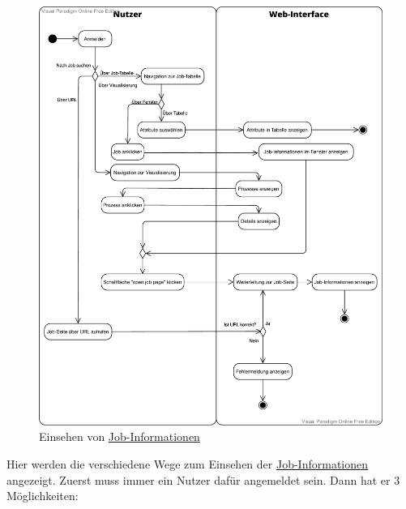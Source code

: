 \begin{figure}[H]
    \centering
    \includegraphics[width=\textwidth]{images-interface/v3_aktivitaetsdiagramme/Get_information_v3.pdf}
    \caption{Einsehen von \hyperref[B:Job-Informationen]{Job-Informationen}}
\end{figure}
\newpage
Hier werden die verschiedene Wege zum Einsehen der \hyperref[B:Job-Informationen]{Job-Informationen} angezeigt. Zuerst muss immer ein \gls{Nutzer} dafür angemeldet sein. Dann hat er 3 Möglichkeiten: 
